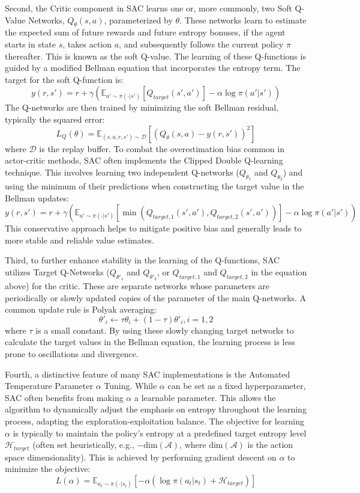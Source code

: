 Second, the Critic component in \gls{SAC} learns one or, more commonly, two Soft Q-Value Networks, \(Q_\theta(s, a)\), parameterized by \(\theta\). These networks learn to estimate the expected sum of future rewards and future entropy bonuses, if the agent starts in state \(s\), takes action \(a\), and subsequently follows the current policy \(\pi\) thereafter. This is known as the soft Q-value. The learning of these Q-functions is guided by a modified Bellman equation that incorporates the entropy term. The target for the soft Q-function is:
\[y(r, s') = r + \gamma(\mathbb{E}_{a' \sim \pi(\cdot|s')} [Q_{target}(s', a')] - \alpha \log \pi(a'|s'))\]
The Q-networks are then trained by minimizing the soft Bellman residual, typically the squared error:
\[L_Q(\theta) = \mathbb{E}_{(s,a,r,s') \sim \mathcal{D}} [(Q_\theta(s,a) - y(r,s'))^2]\]
where \(\mathcal{D}\) is the replay buffer. To combat the overestimation bias common in actor-critic methods, \gls{SAC} often implements the Clipped Double Q-learning technique. This involves learning two independent Q-networks (\(Q_{\theta_1}\) and \(Q_{\theta_2}\)) and using the minimum of their predictions when constructing the target value in the Bellman updates:
\[y(r, s') = r + \gamma(\mathbb{E}_{a' \sim \pi(\cdot|s')} [\min(Q_{target,1}(s', a'), Q_{target,2}(s', a'))] - \alpha \log \pi(a'|s'))\]
This conservative approach helps to mitigate positive bias and generally leads to more stable and reliable value estimates.

Third, to further enhance stability in the learning of the Q-functions, \gls{SAC} utilizes Target Q-Networks (\(Q_{\theta'_1}\) and \(Q_{\theta'_2}\), or \(Q_{target,1}\) and \(Q_{target,2}\) in the equation above) for the critic. These are separate networks whose parameters are periodically or slowly updated copies of the parameter of the main Q-networks. A common update rule is Polyak averaging:
\[\theta'_i \leftarrow \tau\theta_i + (1-\tau)\theta'_i, i=1,2\]
where \(\tau\) is a small constant. By using these slowly changing target networks to calculate the target values in the Bellman equation, the learning process is less prone to oscillations and divergence.

Fourth, a distinctive feature of many \gls{SAC} implementations is the Automated Temperature Parameter \(\alpha\) Tuning. While \(\alpha\) can be set as a fixed hyperparameter, \gls{SAC} often benefits from making \(\alpha\) a learnable parameter. This allows the algorithm to dynamically adjust the emphasis on entropy throughout the learning process, adapting the exploration-exploitation balance. The objective for learning \(\alpha\) is typically to maintain the policy's entropy at a predefined target entropy level \(\mathcal{H}_{target}\) (often set heuristically, e.g., \(-\text{dim}(\mathcal{A})\), where \(\text{dim}(\mathcal{A})\) is the action space dimensionality). This is achieved by performing gradient descent on \(\alpha\) to minimize the objective:
\[L(\alpha) = \mathbb{E}_{a_t \sim \pi(\cdot|s_t)} [-\alpha (\log \pi(a_t|s_t) + \mathcal{H}_{target})]\]

